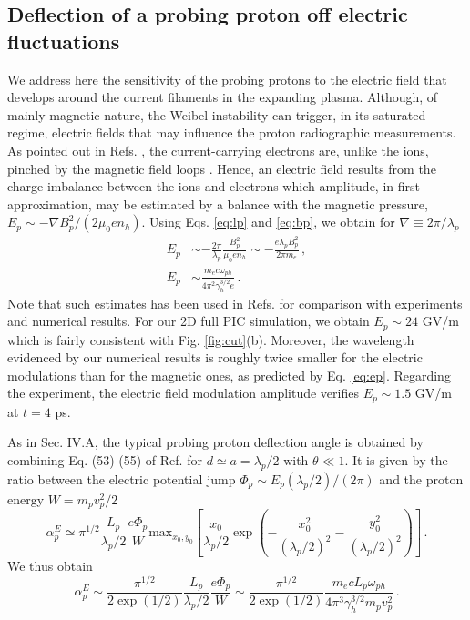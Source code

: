 \documentclass[aps,showpacs,superscriptaddress]{revtex4}
\begin{document}
\subsection{Deflection of a probing proton off electric fluctuations}
 We address here the sensitivity of the probing protons to the electric field that develops around the current filaments in the expanding plasma.
Although, of mainly magnetic nature, the Weibel instability can trigger, in its saturated regime, electric fields  that may influence the proton radiographic measurements.
As pointed out in Refs. \cite{POP_Dieckmann_2009, POP_Bret_Gremillet_2010}, the current-carrying electrons  are,  unlike the ions,  pinched by the magnetic field loops . Hence, an electric field  results from the charge imbalance between the  ions and electrons which amplitude, in first approximation, may be estimated by a balance with the  magnetic pressure, $E_p \sim  - \nabla B_p^2/(2 \mu_0e n_h)$. 
Using Eqs. \eqref{eq:lp} and  \eqref{eq:bp}, we obtain  for $\nabla\equiv 2\pi/\lambda_p$
\begin{align}
E_p& \sim -  \frac{2\pi}{\lambda_p} \frac{B_p^2}{ \mu_0 e n_h }
\sim -  \frac{e\lambda_pB_p^2}{  2\pi  m_e } \, ,
 \label{eq:ep1}  \\
E_p& \sim\frac{m_ec\omega_{ph}}{4\pi^2\gamma_h^{3/2} e} \label{eq:ep}
 \, .
\end{align}
Note that such estimates has been used  in Refs. \cite{POP_Dieckmann_2009,POP_Ruyer_2015,PRL_Gode_2017} for comparison with experiments and numerical results.  
For our 2D full PIC simulation, we obtain $E_p\sim 24 $ GV/m which is fairly consistent with Fig. \ref{fig:cut}(b). Moreover, the  wavelength evidenced by our numerical results is roughly twice smaller for the electric modulations than for the magnetic ones, as predicted by Eq. \eqref{eq:ep}. Regarding the experiment, the electric field modulation amplitude verifies  $E_p \sim 1.5$ GV/m at $t=4$ ps.

As in Sec. IV.A, the typical probing proton deflection angle is obtained by combining Eq.  (53)-(55) of Ref. \cite[]{RSI_protograhyb} for $d\simeq a= \lambda_p/2 $
with $\theta \ll 1$. 
It is given by the ratio between the electric potential jump $\Phi_p\sim E_p(\lambda_p/2)/(2\pi)$ and the proton energy $W = m_pv_p^2/2$ 
\begin{equation}\label{eq:alphaep0}
\alpha^E_p \simeq \pi^{1/2}  \frac{L_p}{\lambda_p/2} \frac{e \Phi_p }{W}  \mathrm{max}_{x_0,y_0}\left[  
\frac{x_0}{\lambda_p/2}\exp\left(-\frac{x_0^2}{(\lambda_p/2)^2}-\frac{y_0^2}{ (\lambda_p/2)^2} \right) 
\right] \, .
\end{equation}
We thus obtain
\begin{equation}\label{eq:alphaep}
 \alpha^E_p \sim \frac{\pi^{1/2}}{2\exp(1/2)} \frac{L_p}{\lambda_p/2} \frac{e \Phi_p }{W} 
 \sim  \frac{\pi^{1/2}}{2\exp(1/2)}   \frac{m_ecL_p\omega_{ph}}{4\pi^3\gamma_h^{3/2}m_p v_p^2 }
 \, .
\end{equation}
\end{document}

